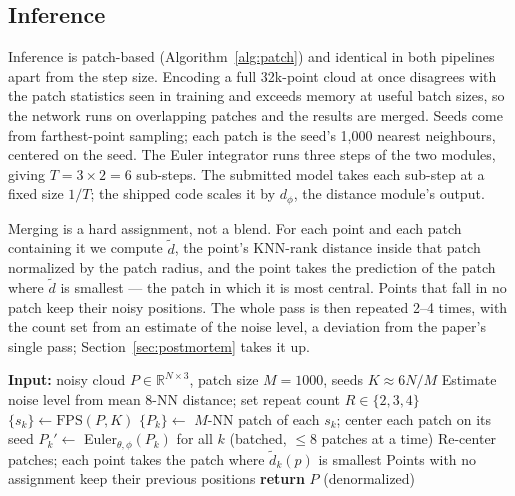 \documentclass{article}
\begin{document}
\subsection{Inference}

Inference is patch-based (Algorithm~\ref{alg:patch}) and identical in both pipelines apart from the step size. Encoding a full 32k-point cloud at once disagrees with the patch statistics seen in training and exceeds memory at useful batch sizes, so the network runs on overlapping patches and the results are merged. Seeds come from farthest-point sampling; each patch is the seed's 1{,}000 nearest neighbours, centered on the seed. The Euler integrator runs three steps of the two modules, giving $T = 3 \times 2 = 6$ sub-steps. The submitted model takes each sub-step at a fixed size $1/T$; the shipped code scales it by $d_\phi$, the distance module's output.

Merging is a hard assignment, not a blend. For each point and each patch containing it we compute $\tilde{d}$, the point's KNN-rank distance inside that patch normalized by the patch radius, and the point takes the prediction of the patch where $\tilde{d}$ is smallest --- the patch in which it is most central. Points that fall in no patch keep their noisy positions. The whole pass is then repeated 2--4 times, with the count set from an estimate of the noise level, a deviation from the paper's single pass; Section~\ref{sec:postmortem} takes it up.

\begin{algorithm}[t]
  \caption{Patch-based filtering of one noisy cloud}
  \label{alg:patch}
  \begin{algorithmic}[1]
    \State \textbf{Input:} noisy cloud $P \in \mathbb{R}^{N \times 3}$, patch size $M{=}1000$, seeds $K{\approx}6N/M$
    \State Estimate noise level from mean 8-NN distance; set repeat count $R \in \{2,3,4\}$
      \State $\{s_k\} \gets \mathrm{FPS}(P, K)$ 
      \State $\{P_k\} \gets$ $M$-NN patch of each $s_k$; center each patch on its seed
      \State $P_k' \gets$ Euler$_{\theta,\phi}(P_k)$ for all $k$ (batched, $\le 8$ patches at a time)
      \State Re-center patches; each point takes the patch where $\tilde{d}_k(p)$ is smallest
      \State Points with no assignment keep their previous positions
    \EndFor
    \State \textbf{return} $P$ (denormalized)
  \end{algorithmic}
\end{algorithm}
\end{document}
